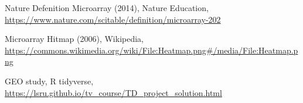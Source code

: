 \documentclass{article}
\begin{document}
\newpage
\begin{thebibliography}{99}
	\begin{latin}
		Nature Defenition Microarray (2014), Nature Education, \url{https://www.nature.com/scitable/definition/microarray-202}
		
		Microarray Hitmap (2006), Wikipedia, \url{https://commons.wikimedia.org/wiki/File:Heatmap.png#/media/File:Heatmap.png}
		
		GEO study, R tidyverse, \url{https://lsru.github.io/tv_course/TD_project_solution.html}
		
	\end{latin}
\end{thebibliography}
\end{document}
